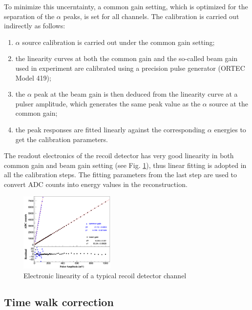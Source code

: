 \documentclass[number,5p]{elsarticle}
\begin{document}
To minimize this uncerntainty, a common gain setting, which is optimized for the separation of the \(\alpha\) peaks, is set for all channels.
The calibration is carried out indirectly as follows:
\begin{enumerate}
\item \(\alpha\) source calibration is carried out under the common gain setting;
\item the linearity curves at both the common gain and the so-called beam gain used
  in experiment are calibrated using a precision pulse generator (ORTEC Model 419);
\item the $\alpha$ peak at the beam gain is then deduced
  from the linearity curve at a pulser amplitude, which generates the same peak
  value as the $\alpha$ source at the common gain;
\item the peak responses are fitted linearly against the corresponding $\alpha$ energies
  to get the calibration parameters.
\end{enumerate}
The readout electronics of the recoil detector has very good linearity in both
common gain and beam gain setting (see Fig. \ref{fig:electronic_linearity}),
thus linear fitting is adopted in all the calibration steps.
The fitting parameters from the last step are used to convert ADC counts into
energy values in the reconstruction.
\begin{figure}[htb!]
  \centering
  \includegraphics[width=0.42\textwidth]{./linearity.png}
  \caption{Electronic linearity of a typical recoil detector channel}
  \label{fig:electronic_linearity}
\end{figure}

\subsection{Time walk correction}
\label{sec:timewalk}
\end{document}

